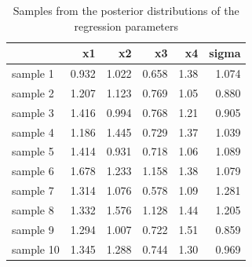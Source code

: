 \documentclass[11pt,a4paper,twoside]{book}
\newenvironment{knitrout}{}{} %
\begin{document}
\begin{knitrout}
\color{fgcolor}\begin{table}

\caption{\label{tab:simdata.postsample2}Samples from the posterior distributions of the regression parameters}
\centering
\begin{tabular}[t]{lrrrrr}
\toprule
  & x1 & x2 & x3 & x4 & sigma\\
\midrule
sample 1 & 0.932 & 1.022 & 0.658 & 1.38 & 1.074\\
sample 2 & 1.207 & 1.123 & 0.769 & 1.05 & 0.880\\
sample 3 & 1.416 & 0.994 & 0.768 & 1.21 & 0.905\\
sample 4 & 1.186 & 1.445 & 0.729 & 1.37 & 1.039\\
sample 5 & 1.414 & 0.931 & 0.718 & 1.06 & 1.089\\
sample 6 & 1.678 & 1.233 & 1.158 & 1.38 & 1.079\\
sample 7 & 1.314 & 1.076 & 0.578 & 1.09 & 1.281\\
sample 8 & 1.332 & 1.576 & 1.128 & 1.44 & 1.205\\
sample 9 & 1.294 & 1.007 & 0.722 & 1.51 & 0.859\\
sample 10 & 1.345 & 1.288 & 0.744 & 1.30 & 0.969\\
\bottomrule
\end{tabular}
\end{table}


\end{knitrout}
\end{document}
